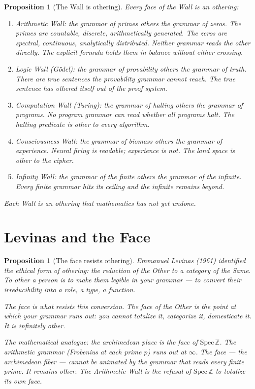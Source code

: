 \documentclass[12pt]{article}
\newtheorem{proposition}[theorem]{Proposition}
\theoremstyle{definition}
\theoremstyle{remark}
\begin{document}
\begin{proposition}[The Wall is othering]
Every face of the Wall \cite{five} is an othering:
\begin{enumerate}
\item \emph{Arithmetic Wall}: the grammar of primes
  others the grammar of zeros.
  The primes are countable, discrete, arithmetically generated.
  The zeros are spectral, continuous, analytically distributed.
  Neither grammar reads the other directly.
  The explicit formula \cite{week09} holds them in balance
  without either crossing.
\item \emph{Logic Wall (G\"odel)}: the grammar of provability
  others the grammar of truth.
  There are true sentences the provability grammar cannot reach.
  The true sentence has othered itself out of the proof system.
\item \emph{Computation Wall (Turing)}: the grammar of halting
  others the grammar of programs.
  No program grammar can read whether all programs halt.
  The halting predicate is other to every algorithm.
\item \emph{Consciousness Wall}: the grammar of biomass
  others the grammar of experience.
  Neural firing is readable; experience is not.
  The land space \cite{consciousness} is other to the cipher.
\item \emph{Infinity Wall}: the grammar of the finite
  others the grammar of the infinite.
  Every finite grammar hits its ceiling
  and the infinite remains beyond.
\end{enumerate}
Each Wall is an othering that mathematics has not yet undone.
\end{proposition}

\section{Levinas and the Face}

\begin{proposition}[The face resists othering]
Emmanuel Levinas (1961) identified the ethical form of othering:
the reduction of the Other to a category of the Same.
To other a person is to make them legible in your grammar ---
to convert their irreducibility into a role, a type, a function.

The face is what resists this conversion.
The face of the Other is the point at which
your grammar runs out:
you cannot totalize it, categorize it, domesticate it.
It is infinitely other.

The mathematical analogue:
the archimedean place is the face of $\mathrm{Spec}\,\mathbb{Z}$.
The arithmetic grammar (Frobenius at each prime $p$)
runs out at $\infty$.
The face --- the archimedean fiber --- cannot be animated
by the grammar that reads every finite prime.
It remains other.
The Arithmetic Wall is the refusal of $\mathrm{Spec}\,\mathbb{Z}$
to totalize its own face.
\end{proposition}
\end{document}
